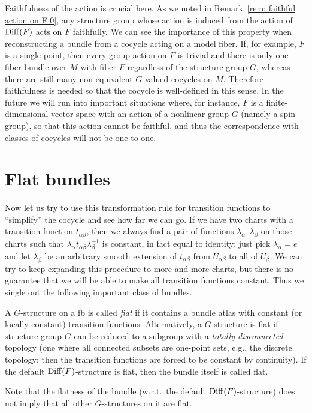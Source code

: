 \begin{rem}\label{rem: faithfulness of action on F}
    Faithfulness of the action is crucial here. As we noted in Remark~\ref{rem: faithful action on F 0}, any structure group whose action is induced from the action of $\operatorname{Diff}(F)$ acts on $F$ faithfully. We can see the importance of this property when reconstructing a bundle from a cocycle acting on a model fiber. If, for example, $F$ is a single point, then every group action on $F$ is trivial and there is only one fiber bundle over $M$ with fiber $F$ regardless of the structure group $G$, whereas there are still many non-equivalent $G$-valued cocycles on $M$. Therefore faithfulness is needed so that the cocycle is well-defined in this sense. In the future we will run into important situations where, for instance, $F$ is a finite-dimensional vector space with an action of a nonlinear group $G$ (namely a spin group), so that this action cannot be faithful, and thus the correspondence with classes of cocycles will not be one-to-one.
\end{rem}






\section{Flat bundles}

Now let us try to use this transformation rule for transition functions to ``simplify'' the cocycle and see how far we can go. If we have two charts with a transition function $t_{\alpha\beta}$, then we always find a pair of functions $\lambda_\alpha,\lambda_\beta$ on those charts such that $\lambda_\alpha t_{\alpha\beta}\lambda_\beta^{-1}$ is constant, in fact equal to identity: just pick $\lambda_\alpha=e$ and let $\lambda_\beta$ be an arbitrary smooth extension of $t_{\alpha\beta}$ from $U_{\alpha\beta}$ to all of $U_\beta$. We can try to keep expanding this procedure to more and more charts, but there is no guarantee that we will be able to make all transition functions constant. Thus we single out the following important class of bundles.

\begin{defn}\label{def flat G-bundle}
	A $G$-structure on a \gls{fb} is called \emph{flat} if it contains a bundle atlas with constant (or locally constant) transition functions. Alternatively, a $G$-structure is flat if structure group $G$ can be reduced to a subgroup with a \emph{totally disconnected} topology (one where all connected subsets are one-point sets, e.g., the discrete topology; then the transition functions are forced to be constant by continuity). If the default $\operatorname{Diff}(F)$-structure is flat, then the bundle itself is called flat.
\end{defn}
\begin{rem}
    Note that the flatness of the bundle (w.r.t.\ the default $\operatorname{Diff}(F)$-structure) does not imply that all other $G$-structures on it are flat.
\end{rem}


